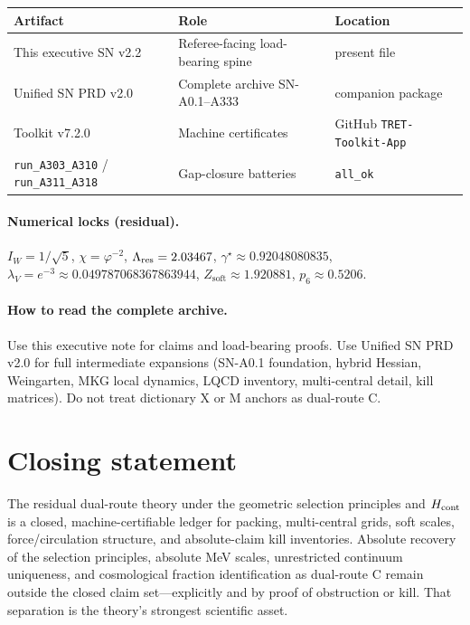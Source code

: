 \documentclass[11pt,a4paper]{article}
\theoremstyle{remark}
\begin{document}
\begin{center}
\begin{tabular}{@{}llp{5.5cm}@{}}
\toprule
\textbf{Artifact} & \textbf{Role} & \textbf{Location} \\
\midrule
This executive SN v2.2 & Referee-facing load-bearing spine & present file \\
Unified SN PRD v2.0 & Complete archive SN-A0.1--A333 & companion package \\
Toolkit v7.2.0 & Machine certificates & GitHub \texttt{TRET-Toolkit-App} \\
\texttt{run\_A303\_A310} / \texttt{run\_A311\_A318} & Gap-closure batteries & \texttt{all\_ok} \\
\bottomrule
\end{tabular}
\end{center}

\paragraph{Numerical locks (residual).}
$I_W=1/\sqrt{5}$, $\chi=\varphi^{-2}$, $\Lambda_{\rm res}=2.03467$, $\gamma^\star\approx 0.92048080835$, $\lambda_V=e^{-3}\approx 0.049787068367863944$, $Z_{\mathrm{soft}}\approx 1.920881$, $p_6\approx 0.5206$.

\paragraph{How to read the complete archive.}
Use this executive note for claims and load-bearing proofs. Use Unified SN PRD v2.0 for full intermediate expansions (SN-A0.1 foundation, hybrid Hessian, Weingarten, MKG local dynamics, LQCD inventory, multi-central detail, kill matrices). Do not treat dictionary X or M anchors as dual-route C.

\section*{Closing statement}
The residual dual-route theory under the geometric selection principles and $H_{\rm cont}$ is a closed, machine-certifiable ledger for packing, multi-central grids, soft scales, force/circulation structure, and absolute-claim kill inventories. Absolute recovery of the selection principles, absolute MeV scales, unrestricted continuum uniqueness, and cosmological fraction identification as dual-route C remain outside the closed claim set---explicitly and by proof of obstruction or kill. That separation is the theory's strongest scientific asset.
\end{document}
